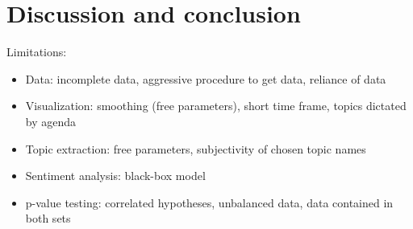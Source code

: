 \documentclass{article}
\begin{document}
\section{Discussion and conclusion}
Limitations:
\begin{itemize}
  \item Data: incomplete data, aggressive procedure to get data, reliance of data
  \item Visualization: smoothing (free parameters), short time frame, topics dictated by agenda
  \item Topic extraction: free parameters, subjectivity of chosen topic names
  \item Sentiment analysis: black-box model
  \item p-value testing: correlated hypotheses, unbalanced data, data contained in both sets
\end{itemize}



\end{document}
